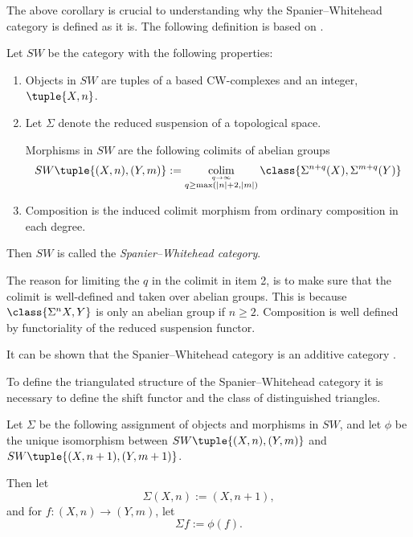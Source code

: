 The above corollary is crucial to understanding why the Spanier--Whitehead category is defined as it is. The following definition is based on \cite[Definition 2]{Schwede_2010}.

\begin{definition}
    \label{def:sw-cat}
    Let \( SW \) be the category with the following properties:
    \begin{enumerate}
        \item {
            Objects in \( SW \) are tuples of a based CW-complexes and an integer, \( \tuple{X, n} \).
        }
        \item {
            Let \( \Sigma \) denote the reduced suspension of a topological space.

            Morphisms in \( SW \) are the following colimits of abelian groups
            \[
                SW\tuple{ (X, n), (Y, m) } := \colim_{\stackrel{q \to \infty}{q \geq \max(|n| + 2, |m|)}} \class{ \Sigma^{n + q}(X), \Sigma^{m + q}(Y) }
            \]
        }
        \item {
            Composition is the induced colimit morphism from ordinary composition in each degree.
        }
    \end{enumerate}

    Then \( SW \) is called the \emph{Spanier--Whitehead category}.
\end{definition}

The reason for limiting the \( q \) in the colimit in item 2, is to make sure that the colimit is well-defined and taken over abelian groups. This is because \( \class{\Sigma^n X, Y} \) is only an abelian group if \( n \geq 2 \). Composition is well defined by functoriality of the reduced suspension functor.

It can be shown that the Spanier--Whitehead category is an additive category \cite[Proposition 5.7]{Daria_Bachelor}.

To define the triangulated structure of the Spanier--Whitehead category it is necessary to define the shift functor and the class of distinguished triangles.

\begin{definition}
    \label{def:sw-shift}
    Let \( \Sigma \) be the following assignment of objects and morphisms in \( SW \), and let \( \phi \) be the unique isomorphism between \( SW\tuple{ (X, n), (Y, m) } \) and \( SW\tuple{ (X, n + 1), (Y, m + 1) } \).

    Then let
    \[
        \Sigma(X, n) := (X, n + 1),
    \] 
    and for \( f: (X, n) \to (Y, m) \), let
    \[
        \Sigma f := \phi(f).
    \]
\end{definition}

